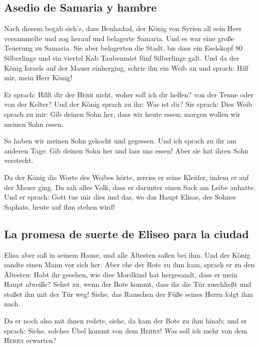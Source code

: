 \hypertarget{asedio-de-samaria-y-hambre}{%
\subsection{Asedio de Samaria y
hambre}\label{asedio-de-samaria-y-hambre}}

 Nach diesem begab sich's, dass Benhadad, der König von
Syrien all sein Heer versammelte und zog herauf und belagerte Samaria.
 Und es war eine große Teuerung zu Samaria. Sie aber
belagerten die Stadt, bis dass ein Eselskopf 80 Silberlinge und ein
viertel Kab Taubenmist fünf Silberlinge galt.  Und da der
König Israels auf der Mauer einherging, schrie ihn ein Weib an und
sprach: Hilf mir, mein Herr König!

 Er sprach: Hilft dir der \textsc{Herr} nicht, woher soll
ich dir helfen? von der Tenne oder von der Kelter?  Und
der König sprach zu ihr: Was ist dir? Sie sprach: Dies Weib sprach zu
mir: Gib deinen Sohn her, dass wir heute essen; morgen wollen wir meinen
Sohn essen.

 So haben wir meinen Sohn gekocht und gegessen. Und ich
sprach zu ihr am anderen Tage: Gib deinen Sohn her und lass uns essen!
Aber sie hat ihren Sohn versteckt.

 Da der König die Worte des Weibes hörte, zerriss er
seine Kleider, indem er auf der Mauer ging. Da sah alles Volk, dass er
darunter einen Sack am Leibe anhatte.  Und er sprach:
Gott tue mir dies und das, wo das Haupt Elisas, des Sohnes Saphats,
heute auf ihm stehen wird!

\hypertarget{la-promesa-de-suerte-de-eliseo-para-la-ciudad}{%
\subsection{La promesa de suerte de Eliseo para la
ciudad}\label{la-promesa-de-suerte-de-eliseo-para-la-ciudad}}

 Elisa aber saß in seinem Hause, und alle Ältesten saßen
bei ihm. Und der König sandte einen Mann vor sich her. Aber ehe der Bote
zu ihm kam, sprach er zu den Ältesten: Habt ihr gesehen, wie dies
Mordkind hat hergesandt, dass er mein Haupt abreiße? Sehet zu, wenn der
Bote kommt, dass ihr die Tür zuschließt und stoßet ihn mit der Tür weg!
Siehe, das Rauschen der Füße seines Herrn folgt ihm nach.

 Da er noch also mit ihnen redete, siehe, da kam der Bote
zu ihm hinab; und er sprach: Siehe, solches Übel kommt von dem
\textsc{Herrn}! Was soll ich mehr von dem \textsc{Herrn} erwarten?

